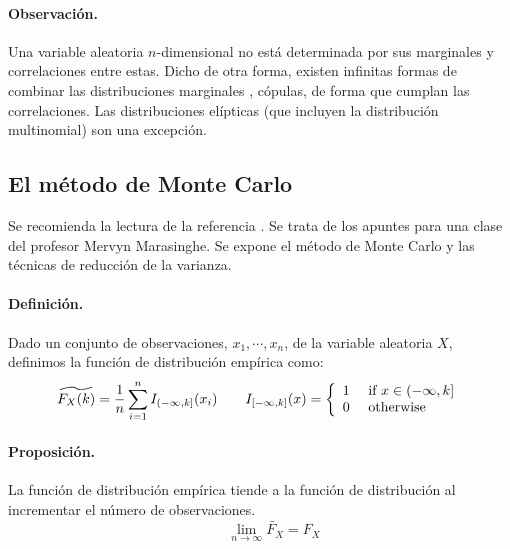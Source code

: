 \paragraph{Observaci\'on.} Una variable aleatoria $n$-dimensional no est\'a 
determinada por sus marginales y correlaciones entre estas. Dicho de otra
forma, existen infinitas formas de combinar las distribuciones marginales
, c\'opulas, de forma que cumplan las correlaciones. Las distribuciones 
el\'ipticas (que incluyen la distribuci\'on multinomial) son una excepci\'on. 


\subsection{El m\'etodo de Monte Carlo}

Se recomienda la lectura de la referencia \cite{mc:mervyn}. Se trata de los 
apuntes para una clase del profesor Mervyn Marasinghe. Se expone el m\'etodo 
de Monte Carlo y las t\'ecnicas de reducci\'on de la varianza.

\paragraph{Definici\'on.} Dado un conjunto de observaciones, $x_1, \cdots, x_n$,
de la variable aleatoria $X$, definimos la funci\'on de distribuci\'on emp\'irica 
como:
\begin{displaymath}
\widetilde{F_X(k)} = \frac{1}{n} \sum_{i=1}^{n} I_{(-\infty,k]}(x_i) \qquad
I_{[-\infty,k]}(x) = \left\{
\begin{array}{ll}
1 & \textrm{ if } x \in (-\infty,k] \cr
0 & \textrm{ otherwise}
\end{array}
\right.
\end{displaymath}

\paragraph{Proposici\'on.} La funci\'on de distribuci\'on emp\'irica tiende a 
la funci\'on de distribuci\'on al incrementar el n\'umero de observaciones.
\begin{displaymath}
\qquad \lim_{n\to\infty} \widetilde{F_X} = F_X
\end{displaymath}

